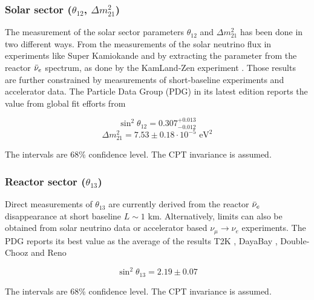 \subsubsection{Solar sector ($\theta_{12}$, $\Delta m^2_{21}$)}

The measurement of the solar sector parameters $\theta_{12}$ and $\Delta m^2_{21}$ has been done in two different ways. From the measurements of the solar neutrino flux in experiments like Super Kamiokande \cite{super-kamiokande_collaboration_solar_2016} and by extracting the parameter from the reactor $\bar{\nu}_{e}$ spectrum, as done by the KamLand-Zen experiment \cite{suzuki_results_2005, kamland_collaboration_reactor_2013}. Those results are further constrained by measurements of short-baseline experiments and accelerator data. The Particle Data Group (PDG) in its latest edition \cite{ParticleDataGroup:2024cfk} reports the value from global fit efforts from \cite{super-kamiokande_collaboration_solar_2016, kamland_collaboration_reactor_2013}

\begin{equation*}
  \sin^2\theta_{12} = 0.307^{+0.013}_{-0.012}
\end{equation*}
\begin{equation*}
  \Delta m^2_{21} = 7.53 \pm 0.18 \cdot 10^{-5} \text{ eV}^2
\end{equation*}

The intervals are 68\% confidence level. The CPT invariance is assumed.

\subsubsection{Reactor sector ($\theta_{13}$)}

Direct measurements of $\theta_{13}$ are currently derived from the reactor $\bar{\nu}_{e}$ disappearance at short baseline $L \sim 1$ km. Alternatively, limits can also be obtained from solar neutrino data or accelerator based $\nu_\mu \rightarrow \nu_e$ experiments. The PDG reports its best value as the average of the results T2K \cite{abe_measurements_2023}, DayaBay \cite{daya_bay_collaboration_precision_2023, daya_bay_collaboration_new_2016}, Double-Chooz \cite{de_kerret_double_2020} and Reno \cite{shin_observation_2020, reno_collaboration_measurement_2018}

\begin{equation*}
  \sin^2\theta_{13} = 2.19 \pm 0.07
\end{equation*}


The intervals are 68\% confidence level. The CPT invariance is assumed.

